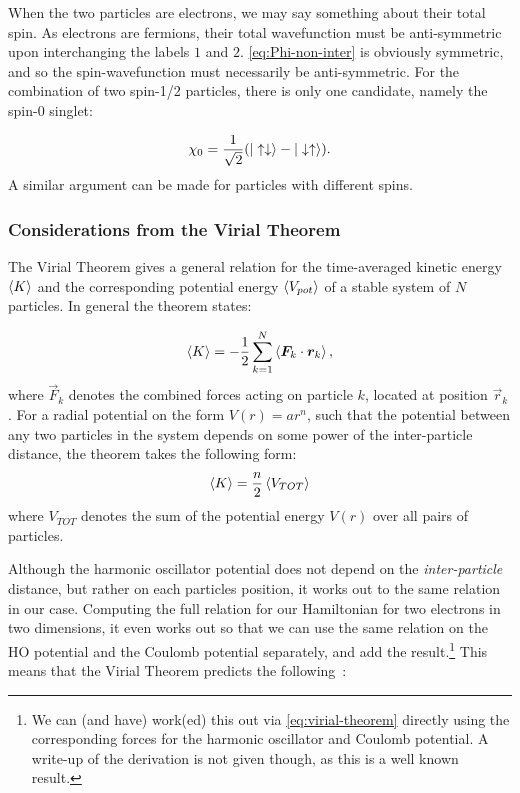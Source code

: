\documentclass[Thesis.tex]{subfiles}
\begin{document}
When the two particles are electrons, we may say something about their total
spin. As electrons are fermions, their total wavefunction must be
anti-symmetric upon interchanging the labels $1$ and $2$.
\autoref{eq:Phi-non-inter} is obviously symmetric, and so the
spin-wavefunction must necessarily be anti-symmetric. For the combination of
two spin-1/2 particles, there is only one candidate, namely the spin-0
singlet:

\begin{align}
    \chi_0 = \frac{1}{\sqrt 2}\qty(| \uparrow\downarrow \rangle -
    | \downarrow\uparrow \rangle).
\end{align}
A similar argument can be made for particles with different spins.

\subsubsection{Considerations from the Virial Theorem}

The Virial Theorem gives a general relation for the time-averaged kinetic
energy $\expval{K}$ and the corresponding potential energy
$\expval{V_{pot}}$ of a stable system of $N$ particles. In general the
theorem states:

\begin{align}
    \expval{K} = -\frac{1}{2}\sum_{k=1}^N \expval{\bm{F}_k \cdot \bm{r}_k},\label{eq:virial-theorem}
\end{align}
where $\vec F_k$ denotes the combined forces acting on particle $k$, located
at position $\vec r_k$. For a radial potential on the form $V(r)=ar^n$, such
that the potential between any two particles in the system depends on some
power of the inter-particle distance, the
theorem takes the following form:
\begin{align}
    \expval{K} = \frac{n}{2}\expval{V_{TOT}}
\end{align}
where $V_{TOT}$ denotes the sum of the potential energy $V(r)$ over all
pairs of particles.

Although the harmonic oscillator potential does not depend on the
\emph{inter-particle} distance, but rather on each particles position, it
works out to the same relation in our case. Computing the full relation for
our Hamiltonian for two electrons in two dimensions, it even works out so
that we can use the same relation on the HO potential and the Coulomb
potential separately, and add the result.\footnote{We can (and have) work(ed) this out
via \autoref{eq:virial-theorem} directly using the corresponding forces for
the harmonic oscillator and Coulomb potential. A write-up of the derivation is not given
though, as this is a well known result.} This means that the Virial Theorem
predicts the following~\cite{Katriel2012}:
\end{document}
